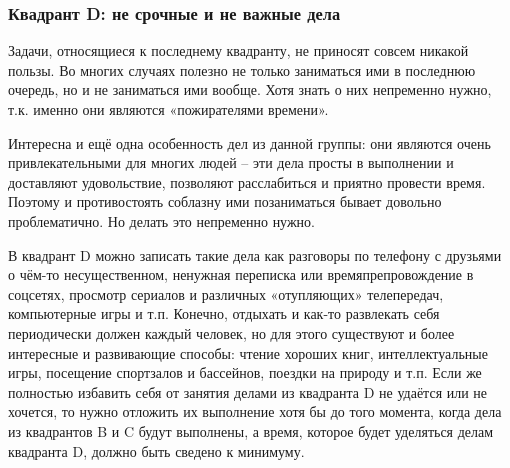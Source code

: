 \subsubsection{Квадрант D: не срочные и не важные дела }


Задачи, относящиеся к последнему квадранту, не приносят совсем никакой пользы. Во многих случаях полезно не только заниматься ими в последнюю очередь, но и не заниматься ими вообще. Хотя знать о них непременно нужно, т.к. именно они являются «пожирателями времени».

Интересна и ещё одна особенность дел из данной группы: они являются очень привлекательными для многих людей – эти дела просты в выполнении и доставляют удовольствие, позволяют расслабиться и приятно провести время. Поэтому и противостоять соблазну ими позаниматься бывает довольно проблематично. Но делать это непременно нужно.

В квадрант D можно записать такие дела как разговоры по телефону с друзьями о чём-то несущественном, ненужная переписка или времяпрепровождение в соцсетях, просмотр сериалов и различных «отупляющих» телепередач, компьютерные игры и т.п. Конечно, отдыхать и как-то развлекать себя периодически должен каждый человек, но для этого существуют и более интересные и развивающие способы: чтение хороших книг, интеллектуальные игры, посещение спортзалов и бассейнов, поездки на природу и т.п. Если же полностью избавить себя от занятия делами из квадранта D не удаётся или не хочется, то нужно отложить их выполнение хотя бы до того момента, когда дела из квадрантов B и C будут выполнены, а время, которое будет уделяться делам квадранта D, должно быть сведено к минимуму.